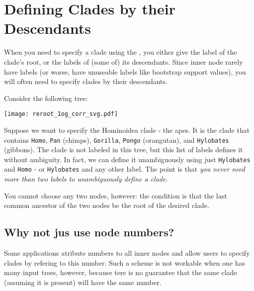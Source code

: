 \chapter{Defining Clades by their Descendants}

When you need to specify a clade using the \nutils{}, you either give the label
of the clade's root, or the labels of (some of) its descendants. Since inner
node rarely have labels (or worse, have unuseable labels like bootstrap support
		values), you will often need to specify clades by their
descendants.

Consider the following tree:

\begin{center}
\texttt{[image: reroot\_1og\_corr\_svg.pdf]} 
\end{center}

Suppose we want to specify the Hominoidea clade - the apes. It is the clade
that contains \texttt{Homo}, \texttt{Pan} (chimps), \texttt{Gorilla},
     \texttt{Pongo} (orangutan), and \texttt{Hylobates} (gibbons). The clade is
     not labeled in this tree, but this list of labels defines it without
     ambiguity. In fact, we can define it unambiguously using just
     \texttt{Hylobates} and \texttt{Homo} - or \texttt{Hylobates} and any other
     label. The point is that \emph{you never need more than two labels to
     unambiguously define a clade}.

You cannot choose any two nodes, however: the condition is that the last
common ancestor of the two nodes be the root of the desired clade.

\section{Why not jus use node numbers?}

Some applications atribute numbers to all inner nodes and allow users to specify clades by refering to this number. Such a scheme is not workable when one has many input trees, however, because tere is no guarantee that the same clade (assuming it is present) will have the same number.
